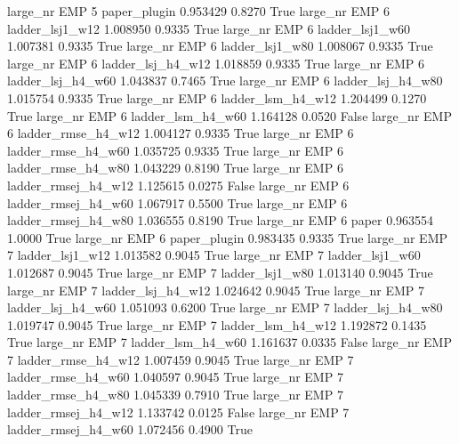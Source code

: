   large_nr      EMP                 5        paper_plugin   0.953429      0.8270    True
  large_nr      EMP                 6     ladder_lsj1_w12   1.008950      0.9335    True
  large_nr      EMP                 6     ladder_lsj1_w60   1.007381      0.9335    True
  large_nr      EMP                 6     ladder_lsj1_w80   1.008067      0.9335    True
  large_nr      EMP                 6   ladder_lsj_h4_w12   1.018859      0.9335    True
  large_nr      EMP                 6   ladder_lsj_h4_w60   1.043837      0.7465    True
  large_nr      EMP                 6   ladder_lsj_h4_w80   1.015754      0.9335    True
  large_nr      EMP                 6   ladder_lsm_h4_w12   1.204499      0.1270    True
  large_nr      EMP                 6   ladder_lsm_h4_w60   1.164128      0.0520   False
  large_nr      EMP                 6  ladder_rmse_h4_w12   1.004127      0.9335    True
  large_nr      EMP                 6  ladder_rmse_h4_w60   1.035725      0.9335    True
  large_nr      EMP                 6  ladder_rmse_h4_w80   1.043229      0.8190    True
  large_nr      EMP                 6 ladder_rmsej_h4_w12   1.125615      0.0275   False
  large_nr      EMP                 6 ladder_rmsej_h4_w60   1.067917      0.5500    True
  large_nr      EMP                 6 ladder_rmsej_h4_w80   1.036555      0.8190    True
  large_nr      EMP                 6               paper   0.963554      1.0000    True
  large_nr      EMP                 6        paper_plugin   0.983435      0.9335    True
  large_nr      EMP                 7     ladder_lsj1_w12   1.013582      0.9045    True
  large_nr      EMP                 7     ladder_lsj1_w60   1.012687      0.9045    True
  large_nr      EMP                 7     ladder_lsj1_w80   1.013140      0.9045    True
  large_nr      EMP                 7   ladder_lsj_h4_w12   1.024642      0.9045    True
  large_nr      EMP                 7   ladder_lsj_h4_w60   1.051093      0.6200    True
  large_nr      EMP                 7   ladder_lsj_h4_w80   1.019747      0.9045    True
  large_nr      EMP                 7   ladder_lsm_h4_w12   1.192872      0.1435    True
  large_nr      EMP                 7   ladder_lsm_h4_w60   1.161637      0.0335   False
  large_nr      EMP                 7  ladder_rmse_h4_w12   1.007459      0.9045    True
  large_nr      EMP                 7  ladder_rmse_h4_w60   1.040597      0.9045    True
  large_nr      EMP                 7  ladder_rmse_h4_w80   1.045339      0.7910    True
  large_nr      EMP                 7 ladder_rmsej_h4_w12   1.133742      0.0125   False
  large_nr      EMP                 7 ladder_rmsej_h4_w60   1.072456      0.4900    True
